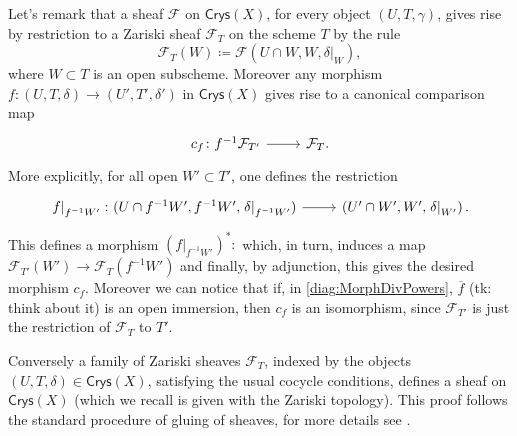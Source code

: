 \documentclass[../Main]{subfiles}
\begin{document}
\begin{rem}
	Let's remark that a sheaf $\mathcal{F}$ on $\mathsf{Crys}(X)$, for every
	object $\left(U, T, \gamma\right)$, gives rise by restriction
	to a Zariski sheaf $\mathcal{F}_T$ on the scheme $T$ by the rule
	\begin{equation*}
	\mathcal{F}_T(W) \coloneqq
	\mathcal{F}(U \cap W, W, \left.\delta\right|_{W})
	,\end{equation*}
	where $W \subset T$ is an open subscheme.
	Moreover any morphism 
	$f\colon \left(U, T, \delta\right) \to \left(U', T', \delta'\right)$
	in $\mathsf{Crys}(X)$
	gives rise to a canonical comparison map
	\begin{equation*}
	\begin{tikzcd}[row sep = 0ex
		,/tikz/column 1/.append style={anchor=base east}
		,/tikz/column 2/.append style={anchor=base west}]
		c_f\colon f^{-1}\mathcal{F}_{T'} \arrow[r, "", rightarrow] &
		\mathcal{F}_T
	.\end{tikzcd}
	\end{equation*} 
	More explicitly, for all open $W' \subset T'$, one defines the restriction
	\begin{equation*}
	\begin{tikzcd}[row sep = 0ex
		,/tikz/column 1/.append style={anchor=base east}
		,/tikz/column 2/.append style={anchor=base west}]
		\left.f\right|_{f^{-1}W'}\colon 
		(U \cap f^{-1}W', f^{-1}W', \left.\delta\right|_{f^{-1}W'} )
		\arrow[r, "", rightarrow] &
		\left(U' \cap W', W', \left.\delta\right|_{W'} \right)
	.\end{tikzcd}
	\end{equation*} 
	This defines a morphism $(\left.f\right|_{f^{-1}W'})^*\colon$
	which, in turn, induces a map $\mathcal{F}_{T'}(W') \to \mathcal{F}_T(f^{-1}W')$
	and finally, by adjunction, this gives the desired morphism $c_f$.
	Moreover we can notice that if, in \cref{diag:MorphDivPowers},
	$\overline{f}$ (tk: think about it) is an open immersion, then
	$c_f$ is an isomorphism, since $\mathcal{F}_{T'}$ is just the restriction
	of $\mathcal{F}_T$ to $T'$.

	Conversely a family of Zariski sheaves $\mathcal{F}_T$, indexed by 
	the objects $\left(U, T, \delta\right) \in \mathsf{Crys}(X)$, satisfying
	the usual cocycle conditions, defines a sheaf on $\mathsf{Crys}(X)$ 
	(which we recall is given with the Zariski topology).
	This proof follows the standard procedure of gluing of sheaves,
	for more details see
	\cite[\href{https://stacks.math.columbia.edu/tag/07IN}{Section 07IN}]{SP}.
\end{rem}
\end{document}
